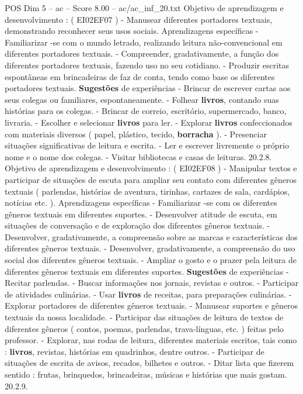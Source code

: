 \begin{textsample}{POS Dim 5 – ac – Score 8.00 – ac/ac\_inf\_20.txt}
Objetivo de aprendizagem e desenvolvimento : ( EI02EF07 ) - Manusear diferentes portadores textuais, demonstrando reconhecer seus usos sociais.
Aprendizagens específicas - Familiarizar -se com o mundo letrado, realizando leitura não-convencional em diferentes portadores textuais. - Compreender, gradativamente, a função dos diferentes portadores textuais, fazendo uso no seu cotidiano. - Produzir escritas espontâneas em brincadeiras de faz de conta, tendo como base os diferentes portadores textuais. \textbf{Sugestões} de experiências - Brincar de escrever cartas aos seus colegas ou familiares, espontaneamente. - Folhear \textbf{livros}, contando suas histórias para os colegas. - Brincar de correio, escritório, supermercado, banco, livraria. - Escolher e selecionar \textbf{livros} para ler. - Explorar \textbf{livros} confeccionados com materiais diversos ( papel, plástico, tecido, \textbf{borracha} ). - Presenciar situações significativas de leitura e escrita. - Ler e escrever livremente o próprio nome e o nome dos colegas. - Visitar bibliotecas e casas de leituras. 20.2.8.
Objetivo de aprendizagem e desenvolvimento : ( EI02EF08 ) - Manipular textos e participar de situações de escuta para ampliar seu contato com diferentes gêneros textuais ( parlendas, histórias de aventura, tirinhas, cartazes de sala, cardápios, notícias etc. ).
Aprendizagens específicas - Familiarizar -se com os diferentes gêneros textuais em diferentes suportes. - Desenvolver atitude de escuta, em situações de conversação e de exploração dos diferentes gêneros textuais. - Desenvolver, gradativamente, a compreensão sobre as marcas e características dos diferentes gêneros textuais. - Desenvolver, gradativamente, a compreensão do uso social dos diferentes gêneros textuais. - Ampliar o gosto e o prazer pela leitura de diferentes gêneros textuais em diferentes suportes. \textbf{Sugestões} de experiências - Recitar parlendas. - Buscar informações nos jornais, revistas e outros. - Participar de atividades culinárias. - Usar \textbf{livros} de receitas, para preparações culinárias. - Explorar portadores de diferentes gêneros textuais. - Manusear suportes e gêneros textuais da nossa localidade. - Participar das situações de leitura de textos de diferentes gêneros ( contos, poemas, parlendas, trava-línguas, etc. ) feitas pelo professor. - Explorar, nas rodas de leitura, diferentes materiais escritos, tais como : \textbf{livros}, revistas, histórias em quadrinhos, dentre outros. - Participar de situações de escrita de avisos, recados, bilhetes e outros. - Ditar lista que fizerem sentido : frutas, brinquedos, brincadeiras, músicas e histórias que mais gostam. 20.2.9.

\end{textsample}
